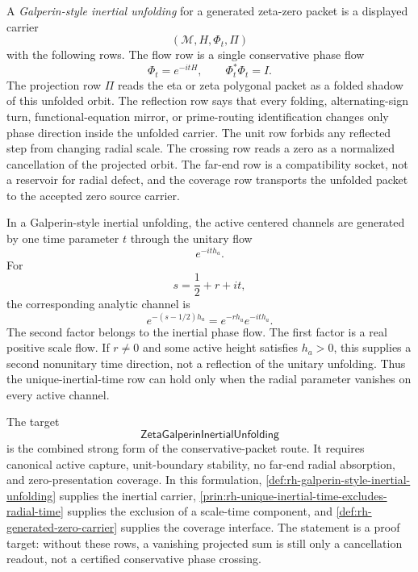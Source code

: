 \begin{definition}
\label{def:rh-galperin-style-inertial-unfolding}
A \emph{Galperin-style inertial unfolding} for a generated zeta-zero
packet is a displayed carrier
$$
(\mathcal M,H,\Phi_t,\Pi)
$$
with the following rows. The flow row is a single conservative phase flow
$$
\Phi_t=e^{-itH},
\qquad
\Phi_t^*\Phi_t=I.
$$
The projection row $\Pi$ reads the eta or zeta polygonal packet as a
folded shadow of this unfolded orbit. The reflection row says that every
folding, alternating-sign turn, functional-equation mirror, or
prime-routing identification changes only phase direction inside the
unfolded carrier. The unit row forbids any reflected step from changing
radial scale. The crossing row reads a zero as a normalized cancellation
of the projected orbit. The far-end row is a compatibility socket, not a
reservoir for radial defect, and the coverage row transports the unfolded
packet to the accepted zero source carrier.
\end{definition}

\begin{principle}
\label{prin:rh-unique-inertial-time-excludes-radial-time}
In a Galperin-style inertial unfolding, the active centered channels are
generated by one time parameter $t$ through the unitary flow
$$
e^{-it h_a}.
$$
For
$$
s=\frac12+r+it,
$$
the corresponding analytic channel is
$$
e^{-(s-1/2)h_a}=e^{-r h_a}e^{-it h_a}.
$$
The second factor belongs to the inertial phase flow. The first factor is
a real positive scale flow. If $r\ne0$ and some active height satisfies
$h_a>0$, this supplies a second nonunitary time direction, not a
reflection of the unitary unfolding. Thus the unique-inertial-time row can
hold only when the radial parameter vanishes on every active channel.
\end{principle}

\begin{principle}
\label{prin:rh-zeta-galperin-inertial-unfolding-target}
The target
$$
\mathsf{ZetaGalperinInertialUnfolding}
$$
is the combined strong form of the conservative-packet route. It requires
canonical active capture, unit-boundary stability, no far-end radial
absorption, and zero-presentation coverage. In this formulation,
\autoref{def:rh-galperin-style-inertial-unfolding} supplies the inertial
carrier, \autoref{prin:rh-unique-inertial-time-excludes-radial-time}
supplies the exclusion of a scale-time component, and
\autoref{def:rh-generated-zero-carrier} supplies the coverage interface.
The statement is a proof target: without these rows, a vanishing projected
sum is still only a cancellation readout, not a certified conservative
phase crossing.
\end{principle}

